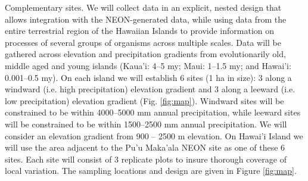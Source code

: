 \documentclass[11pt]{article}
\makeatletter
\renewcommand{\paragraph}{\@startsection{paragraph}{4}{\z@}
  {1ex \@plus 1ex \@minus .2ex}{-1em}
  {\normalfont\normalsize\it}
}
\makeatother
\begin{document}
\paragraph{Complementary sites.}
We will collect data in an explicit, nested design that allows
integration with the NEON-generated data, while using data from the
entire terrestrial region of the Hawaiian Islands to provide
information on processes of several groups of organisms across
multiple scales. Data will be gathered across elevation and
precipitation gradients from evolutionarily old, middle aged and young
islands (Kaua'i: 4--5 my; Maui: 1--1.5 my; and Hawai'i: 0.001--0.5
my).  On each island we will establish 6 sites (1 ha in size): 3 along
a windward (i.e. high precipitation) elevation gradient and 3 along a
leeward (i.e. low precipitation) elevation gradient
(Fig. \ref{fig:map}).  Windward sites will be constrained to be within
4000--5000 mm annual precipitation, while leeward sites will be
constrained to be within 1500--2500 mm annual precipitation.  We will
consider an elevation gradient from 900 -- 2500 m elevation.  On
Hawai'i Island we will use the area adjacent to the Pu'u Maka'ala NEON
site as one of these 6 sites.  Each site will consist of 3 replicate
plots to insure thorough coverage of local variation. The sampling
locations and design are given in Figure \ref{fig:map}.



\end{document}
